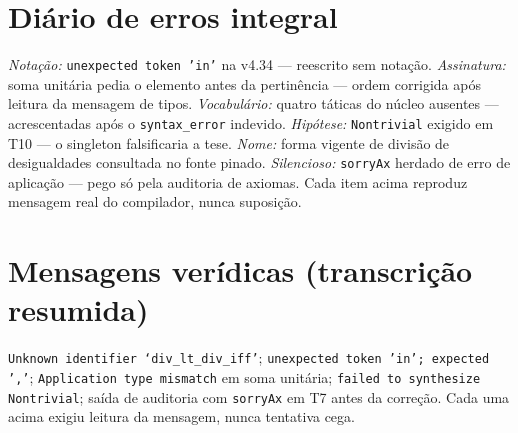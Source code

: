 \section{Diário de erros integral}
\textit{Notação:} \texttt{unexpected token 'in'} na v4.34 --- reescrito sem notação. \textit{Assinatura:} soma unitária pedia o elemento antes da pertinência --- ordem corrigida após leitura da mensagem de tipos. \textit{Vocabulário:} quatro táticas do núcleo ausentes --- acrescentadas após o \texttt{syntax\_error} indevido. \textit{Hipótese:} \texttt{Nontrivial} exigido em T10 --- o singleton falsificaria a tese. \textit{Nome:} forma vigente de divisão de desigualdades consultada no fonte pinado. \textit{Silencioso:} \texttt{sorryAx} herdado de erro de aplicação --- pego só pela auditoria de axiomas. Cada item acima reproduz mensagem real do compilador, nunca suposição.
\section{Mensagens verídicas (transcrição resumida)}
\texttt{Unknown identifier `div\_lt\_div\_iff'}; \texttt{unexpected token 'in'; expected ','}; \nolinkurl{Application type mismatch} em soma unitária; \nolinkurl{failed to synthesize Nontrivial}; saída de auditoria com \texttt{sorryAx} em T7 antes da correção. Cada uma acima exigiu leitura da mensagem, nunca tentativa cega.
